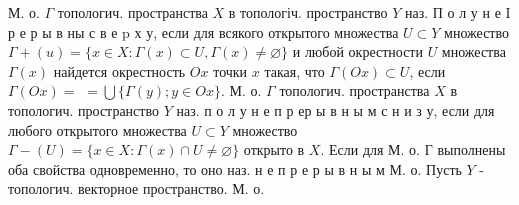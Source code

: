 \documentclass[10pt]{article}
\begin{document}
М. о. $\Gamma$ топологич. пространства $X$ в топологіч. пространство $Y$ наз. П о л у н е I р е р ы в ны с в е p х у, если для всякого открытого множества $U \subset Y$ множество $\Gamma+(u)=\{x \in X: \Gamma(x) \subset U, \Gamma(x) \neq \varnothing\}$ и любой окрестности $U$ множества $\Gamma(x)$ найдется окрестность $O x$ точки $x$ такая, что $\Gamma(O x) \subset U$, если $\Gamma(O x)=$ $=\bigcup\{\Gamma(y) ; y \in O x\}$. М. о. $\Gamma$ топологич. пространства $X$ в топологич. пространство $Y$ наз. п о л у н е п р ер ы в н ы м с н и з у, если для любого открытого множества $U \subset Y$ множество $\Gamma-(U)=\{x \in X: \Gamma(x) \cap U \neq \varnothing\}$ открыто в $X$. Если для М. о. Г выполнены оба свойства одновременно, то оно наз. н е п р е р ы в н ы м М. о. Пусть $Y$ - топологич. векторное пространство. М. о.
\end{document}
